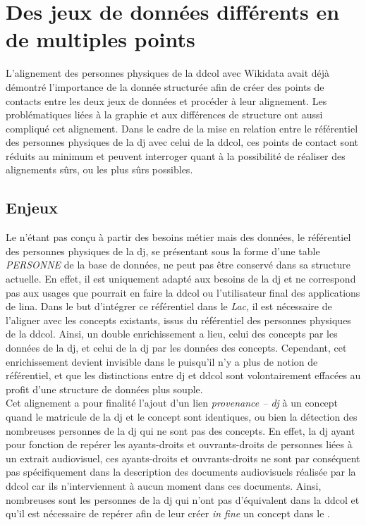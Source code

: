 \section{\label{III-C-1}Des jeux de données différents en de multiples points}

L'alignement des personnes physiques de la \ac{ddcol} avec Wikidata avait déjà démontré l'importance de la donnée structurée afin de créer des points de contacts entre les deux jeux de données et procéder à leur alignement. Les problématiques liées à la graphie et aux différences de structure ont aussi compliqué cet alignement. Dans le cadre de la mise en relation entre le référentiel des personnes physiques de la \ac{dj} avec celui de la \ac{ddcol}, ces points de contact sont réduits au minimum et peuvent interroger quant à la possibilité de réaliser des alignements sûrs, ou les plus sûrs possibles.

\subsection{\label{III-C-1-a}Enjeux}

Le \ldd n'étant pas conçu à partir des besoins métier mais des données, le référentiel des personnes physiques de la \ac{dj}, se présentant sous la forme d'une table \textit{PERSONNE} de la base de données, ne peut pas être conservé dans sa structure actuelle. En effet, il est uniquement adapté aux besoins de la \ac{dj} et ne correspond pas aux usages que pourrait en faire la \ac{ddcol} ou l'utilisateur final des applications de l\ac{ina}. Dans le but d'intégrer ce référentiel dans le \textit{Lac}, il est nécessaire de l'aligner avec les concepts existants, issus du référentiel des personnes physiques de la \ac{ddcol}. Ainsi, un double enrichissement a lieu, celui des concepts par les données de la \ac{dj}, et celui de la \ac{dj} par les données des concepts. Cependant, cet enrichissement devient invisible dans le \ldd puisqu'il n'y a plus de notion de référentiel, et que les distinctions entre \ac{dj} et \ac{ddcol} sont volontairement effacées au profit d'une structure de données plus souple.\\

Cet alignement a pour finalité l'ajout d'un lien \textit{provenance -- \ac{dj}} à un concept quand le matricule de la \ac{dj} et le concept sont identiques, ou bien la détection des nombreuses personnes de la \ac{dj} qui ne sont pas des concepts. En effet, la \ac{dj} ayant pour fonction de repérer les ayants-droits et ouvrants-droits de personnes liées à un extrait audiovisuel, ces ayants-droits et ouvrants-droits ne sont par conséquent pas spécifiquement dans la description des documents audiovisuels réalisée par la \ac{ddcol} car ils n'interviennent à aucun moment dans ces documents. Ainsi, nombreuses sont les personnes de la \ac{dj} qui n'ont pas d'équivalent dans la \ac{ddcol} et qu'il est nécessaire de repérer afin de leur créer \textit{in fine} un concept dans le \ldd.\\

